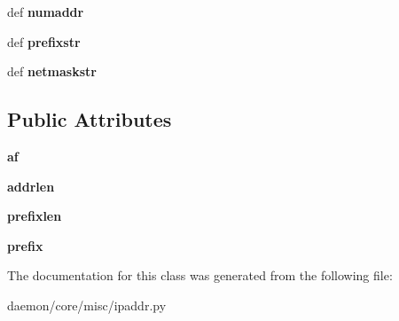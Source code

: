 \begin{DoxyCompactItemize}
\item 
\hypertarget{classcore_1_1misc_1_1ipaddr_1_1_i_p_prefix_aae65521897c0a50887e52251b1523bae}{def {\bfseries numaddr}}\label{classcore_1_1misc_1_1ipaddr_1_1_i_p_prefix_aae65521897c0a50887e52251b1523bae}

\item 
\hypertarget{classcore_1_1misc_1_1ipaddr_1_1_i_p_prefix_af7171729c2ba1ddda9da6dffec89ac54}{def {\bfseries prefixstr}}\label{classcore_1_1misc_1_1ipaddr_1_1_i_p_prefix_af7171729c2ba1ddda9da6dffec89ac54}

\item 
\hypertarget{classcore_1_1misc_1_1ipaddr_1_1_i_p_prefix_a060e7eb07d7889ea8101a6cf26fe4f92}{def {\bfseries netmaskstr}}\label{classcore_1_1misc_1_1ipaddr_1_1_i_p_prefix_a060e7eb07d7889ea8101a6cf26fe4f92}

\end{DoxyCompactItemize}
\subsection*{Public Attributes}
\begin{DoxyCompactItemize}
\item 
\hypertarget{classcore_1_1misc_1_1ipaddr_1_1_i_p_prefix_adfbb8d9e87568aa1fcb9b55801e4b570}{{\bfseries af}}\label{classcore_1_1misc_1_1ipaddr_1_1_i_p_prefix_adfbb8d9e87568aa1fcb9b55801e4b570}

\item 
\hypertarget{classcore_1_1misc_1_1ipaddr_1_1_i_p_prefix_a152fddbb334cd6de46181bfa937cc105}{{\bfseries addrlen}}\label{classcore_1_1misc_1_1ipaddr_1_1_i_p_prefix_a152fddbb334cd6de46181bfa937cc105}

\item 
\hypertarget{classcore_1_1misc_1_1ipaddr_1_1_i_p_prefix_ae98d218490964a907454a35b2298137b}{{\bfseries prefixlen}}\label{classcore_1_1misc_1_1ipaddr_1_1_i_p_prefix_ae98d218490964a907454a35b2298137b}

\item 
\hypertarget{classcore_1_1misc_1_1ipaddr_1_1_i_p_prefix_a1f74dbb5f05aed4da1161281d0fa161a}{{\bfseries prefix}}\label{classcore_1_1misc_1_1ipaddr_1_1_i_p_prefix_a1f74dbb5f05aed4da1161281d0fa161a}

\end{DoxyCompactItemize}


The documentation for this class was generated from the following file\+:\begin{DoxyCompactItemize}
\item 
daemon/core/misc/ipaddr.\+py\end{DoxyCompactItemize}
